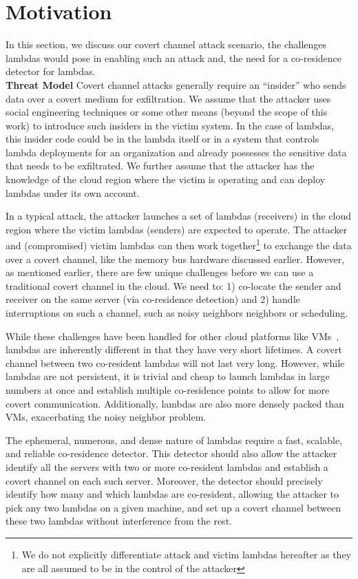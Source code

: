 
\section{Motivation}
\label{sec:motivation}

In this section, we discuss our covert channel attack scenario, the challenges
lambdas would pose in enabling such an attack and, the need for a co-residence
detector for lambdas. \\

\textbf{Threat Model}
Covert channel attacks generally require an ``insider'' who sends data over a
covert medium for exfiltration. We assume that the attacker uses social
engineering techniques or some other means (beyond the scope of this work) to
introduce  such insiders in the victim system. In the case of lambdas, this
insider code could be in the lambda itself or in a system that controls lambda
deployments for an organization and already possesses the sensitive data that
needs to be exfiltrated.  We further assume that the attacker has the knowledge
of the cloud region where the victim is operating and can deploy lambdas under
its own account.

In a typical attack, the attacker launches a set of lambdas (receivers) in the
cloud region where the victim lambdas (senders) are expected to operate. The
attacker and (compromised) victim lambdas can then work together\footnote{We
do not explicitly differentiate attack and victim lambdas hereafter as they are
all assumed to be in the control of the attacker} to exchange the data over a covert
channel, like the memory bus hardware discussed earlier.  However, as
mentioned earlier, there are few unique challenges before we can use a
traditional covert channel in the cloud. We need to: 1) co-locate the sender and
receiver on the same server (via co-residence detection) and 2)
handle interruptions on such a channel, such as noisy neighbors
neighbors or scheduling.

While these challenges have been handled for other cloud platforms like 
VMs~\cite{varad191016,wuusenix2012}, lambdas are inherently different in that they have very short
lifetimes. A covert channel between two co-resident lambdas will not last very
long. However, while lambdas are not persistent, it is trivial and cheap to
launch lambdas in large numbers at once and establish multiple co-residence
points to allow for more covert communication.  Additionally, lambdas are also
more densely packed than VMs, exacerbating the noisy neighbor problem.

The ephemeral, numerous, and dense nature of lambdas require a fast, scalable,
and reliable co-residence detector. This detector should also allow the attacker
identify all the servers with two or more co-resident lambdas and establish a
covert channel on each such server. Moreover, the detector should precisely
identify how many and which lambdas are co-resident, allowing the attacker to
pick any two lambdas on a given machine, and set up a covert channel between
these two lambdas without interference from the rest. 


